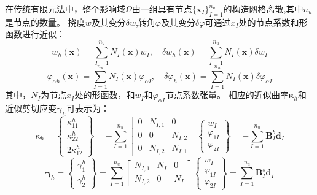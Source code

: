 在传统有限元法中，整个影响域$\Omega$由一组具有节点$\{\boldsymbol x_I\}_{I=1}^{n_u}$的构造网格离散,其中$n_u$是节点的数量。
挠度$w$及其变分$\delta w $,转角$\varphi$及其变分$\delta \varphi $可通过$x_I$处的节点系数和形函数进行近似：
\begin{equation}
    w_h(\boldsymbol x) = \sum_{I=1}^{n_u} N_I(\boldsymbol x) w_I, \quad \delta w_h(\boldsymbol x) = \sum_{I=1}^{n_u} N_I(\boldsymbol x) \delta w_I
\end{equation}
\begin{equation}
    \varphi_{\alpha h}(\boldsymbol x) = \sum_{I=1}^{n_u} N_I(\boldsymbol x) \varphi_{\alpha I}, \quad \delta \varphi_h(\boldsymbol x) = \sum_{I=1}^{n_u} N_I(\boldsymbol x) \delta \varphi_{\alpha I}
\end{equation}
其中，$N_I$为节点$x_I$处的形函数，和$w_I$和$\varphi_{\alpha I}$节点系数张量。
相应的近似曲率$\pmb\kappa_h$和近似剪切应变$\pmb\gamma_h$可表示为：
\begin{equation}
    \boldsymbol\kappa_h = 
    \begin{Bmatrix}
        \kappa^h_{11} \\ \kappa^h_{22} \\ 2\kappa^h_{12} 
    \end{Bmatrix} = -\sum_{I=1}^{n_u}
    \begin{bmatrix}
        0 & N_{I,1} & 0 \\ 0 & 0 & N_{I,2} \\ 0 & N_{I,2} & N_{I,1}
    \end{bmatrix}
    \begin{Bmatrix}
        w_I \\ \varphi_{1I} \\ \varphi_{2I}
    \end{Bmatrix} = - \sum_{I=1}^{n_u} \boldsymbol B^b_I \boldsymbol d_I
\end{equation}
\begin{equation}
    \boldsymbol\gamma_h = 
    \begin{Bmatrix}
        \gamma^h_1 \\ \gamma^h_2
    \end{Bmatrix} = \sum_{I=1}^{n_u}
    \begin{bmatrix}
        N_{I,1} & N_I & 0 \\
        N_{I,2} & 0 & N_I
    \end{bmatrix}
    \begin{Bmatrix}
        w_I \\ \varphi_{1I} \\ \varphi_{2I}
    \end{Bmatrix} = \sum_{I=1}^{n_u} \boldsymbol B^s_I \boldsymbol d_I
\end{equation}
